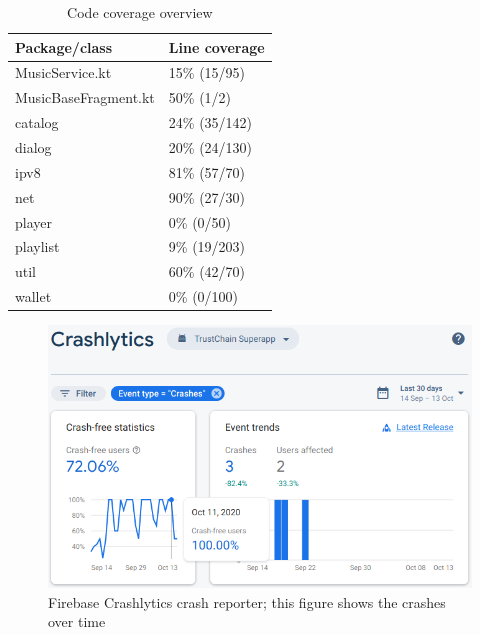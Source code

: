 \begin{table}[]
\begin{tabular}{|l|l|}
\hline
\textbf{Package/class} & \textbf{Line coverage} \\ \hline
MusicService.kt        & 15\% (15/95)           \\ \hline
MusicBaseFragment.kt   & 50\% (1/2)             \\ \hline
catalog                & 24\% (35/142)          \\ \hline
dialog                 & 20\% (24/130)          \\ \hline
ipv8                   & 81\% (57/70)           \\ \hline
net                    & 90\% (27/30)           \\ \hline
player                 & 0\% (0/50)             \\ \hline
playlist               & 9\% (19/203)           \\ \hline
util                   & 60\% (42/70)           \\ \hline
wallet                 & 0\% (0/100)            \\ \hline
\end{tabular}
\caption{Code coverage overview}
\label{tab:code-cov}
\end{table}

\begin{figure}
    \includegraphics[width=0.8\linewidth]{implementation/firebase-crashlytics.png}
    \caption{Firebase Crashlytics crash reporter; this figure shows the crashes over time}
    \label{fig:firebase-crashlytics}
\end{figure}